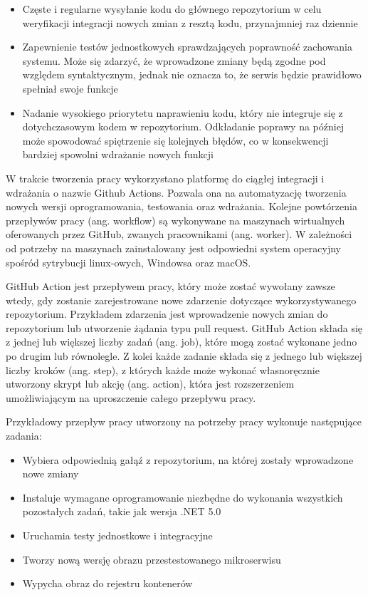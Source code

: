 \documentclass[11pt, a4]{article} %
\begin{document}
\begin{itemize} %
    \item Częste i regularne wysyłanie kodu do głównego repozytorium w celu weryfikacji 
    integracji nowych zmian z resztą kodu, przynajmniej raz dziennie 
    \item Zapewnienie testów jednostkowych sprawdzających poprawność zachowania systemu. 
    Może się zdarzyć, że wprowadzone zmiany będą zgodne pod względem 
    syntaktycznym, jednak nie oznacza to, że serwis będzie prawidłowo spełniał swoje 
    funkcje 
    \item Nadanie wysokiego priorytetu naprawieniu kodu, który nie integruje się z 
    dotychczasowym kodem w repozytorium. Odkładanie poprawy na później może spowodować 
    spiętrzenie się kolejnych błędów, co w konsekwencji bardziej spowolni wdrażanie 
    nowych funkcji
\end{itemize}

W trakcie tworzenia pracy wykorzystano platformę do ciągłej integracji i wdrażania 
o nazwie Github Actions. Pozwala ona na automatyzację tworzenia nowych wersji 
oprogramowania, testowania oraz wdrażania. Kolejne powtórzenia przepływów pracy 
(ang. workflow) są wykonywane na maszynach wirtualnych oferowanych przez 
GitHub, zwanych pracownikami (ang. worker). W zależności od potrzeby na maszynach 
zainstalowany jest odpowiedni system operacyjny spośród sytrybucji 
linux-owych, Windowsa oraz macOS.

GitHub Action jest przepływem pracy, który może zostać wywołany zawsze wtedy, gdy 
zostanie zarejestrowane nowe zdarzenie dotyczące wykorzystywanego repozytorium. 
Przykładem zdarzenia jest wprowadzenie nowych zmian do repozytorium lub utworzenie 
żądania typu pull request. GitHub Action składa się z jednej lub większej liczby 
zadań (ang. job), które mogą zostać wykonane jedno po drugim lub równolegle. Z kolei 
każde zadanie składa się z jednego lub większej liczby kroków (ang. step), z których 
każde może wykonać własnoręcznie utworzony skrypt lub akcję (ang. action), która jest 
rozszerzeniem umożliwiającym na uproszczenie całego przepływu pracy.

Przykładowy przepływ pracy utworzony na potrzeby pracy wykonuje następujące zadania:

\begin{itemize} %
    \item Wybiera odpowiednią gałąź z repozytorium, na której zostały wprowadzone 
    nowe zmiany
    \item Instaluje wymagane oprogramowanie niezbędne do wykonania wszystkich 
    pozostałych zadań, takie jak wersja .NET 5.0
    \item Uruchamia testy jednostkowe i integracyjne
    \item Tworzy nową wersję obrazu przestestowanego mikroserwisu
    \item Wypycha obraz do rejestru kontenerów
\end{itemize}
\end{document}
